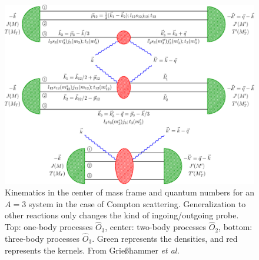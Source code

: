 \documentclass[a4paper,11pt]{article}
\newcommand{\etal}{\textit{et al.}}
\begin{document}
\begin{figure}[h!]
  \begin{center}
    \includegraphics[scale=0.7]{kinematics3He.pdf}
    \caption{Kinematics in the center of mass frame and quantum
      numbers for an $A=3$ system in the case of Compton scattering.
      Generalization to other reactions only changes the kind of
      ingoing/outgoing probe. Top: one-body processes $\hat{O}_3$, center: two-body
      processes $\hat{O}_{2}$, bottom: three-body processes $\hat{O}_{3}$. Green represents the
      densities, and red represents the kernels. From Grie{\ss}hammer \etal
    \cite{hammer2020}}
    \label{fig:onetwobod}
  \end{center}
\end{figure}
\end{document}
